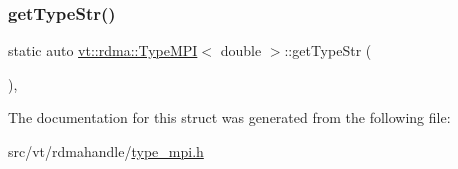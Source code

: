 \subsubsection{\texorpdfstring{get\+Type\+Str()}{getTypeStr()}}
{\footnotesize\ttfamily static auto \hyperlink{structvt_1_1rdma_1_1_type_m_p_i}{vt\+::rdma\+::\+Type\+M\+PI}$<$ double $>$\+::get\+Type\+Str (\begin{DoxyParamCaption}{ }\end{DoxyParamCaption})\hspace{0.3cm}{\ttfamily [inline]}, {\ttfamily [static]}}



The documentation for this struct was generated from the following file\+:\begin{DoxyCompactItemize}
\item 
src/vt/rdmahandle/\hyperlink{type__mpi_8h}{type\+\_\+mpi.\+h}\end{DoxyCompactItemize}
